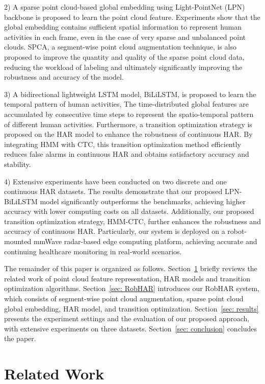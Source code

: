 2) A sparse point cloud-based global embedding using Light-PointNet (LPN) backbone is proposed to learn the point cloud feature. 
Experiments show that the global embedding contains sufficient spatial information to represent human activities in each frame, even in the case of very sparse and unbalanced point clouds.
SPCA, a segment-wise point cloud augmentation technique, is also proposed to improve the quantity and quality of the sparse point cloud data, reducing the workload of labeling and ultimately significantly improving the robustness and accuracy of the model. 

\par
3) A bidirectional lightweight LSTM model, BiLiLSTM, is proposed to learn the temporal pattern of human activities, 
The time-distributed global features are accumulated by consecutive time steps to represent the spatio-temporal pattern of different human activities. 
Furthermore, a transition optimization strategy is proposed on the HAR model to enhance the robustness of continuous HAR. By integrating HMM with CTC, this transition optimization method efficiently reduces false alarms in continuous HAR and obtains satisfactory accuracy and stability. 
\par
4) Extensive experiments have been conducted on two discrete and one continuous HAR datasets. The results demonstrate that our proposed LPN-BiLiLSTM model significantly outperforms the benchmarks, achieving higher accuracy with lower computing costs on all datasets. Additionally, our proposed transition optimization strategy, HMM-CTC, further enhances the robustness and accuracy of continuous HAR. Particularly, our system is deployed on a robot-mounted mmWave radar-based edge computing platform, achieving accurate and continuing healthcare monitoring in real-world scenarios. 

The remainder of this paper is organized as follows. 
Section~\ref{sect:relatedwork} briefly reviews the related work of point cloud feature representation, HAR models and transition optimization algorithms. 
Section~\ref{sec: RobHAR} introduces our RobHAR system, which consists of segment-wise point cloud augmentation, sparse point cloud global embedding, HAR model, and transition optimization. 
Section~\ref{sec: results} presents the experiment settings and the evaluation of our proposed approach, with extensive experiments on three datasets. 
Section~\ref{sec: conclusion} concludes the paper.




\section{Related Work}
\label{sect:relatedwork}


